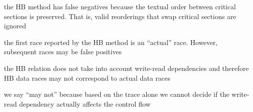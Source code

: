 \documentclass[landscape, a4paper]{article}
\begin{document}
\begin{minipage}[t]{0.2\linewidth}
	\begin{betterlist}
		\item {}
		\begin{betterlist}
			\item {}
			\begin{betterlist}
				\item the HB method has \alert{false negatives} because the textual order between critical sections is preserved. That is, valid reorderings that swap critical sections are ignored
				\item the first race reported by the HB method is an \enquote{actual} race. However, subsequent races may be \alert{false positives}
				\begin{betterlist}
					\item the HB relation does not take into account write-read dependencies and therefore HB data races may not correspond to actual data races
					\item we say \enquote{may not} because based on the trace alone we cannot decide if the write-read dependency actually affects the control flow
				\end{betterlist}


\end{betterlist}
\end{betterlist}
\end{betterlist}
\end{minipage}
\end{document}
